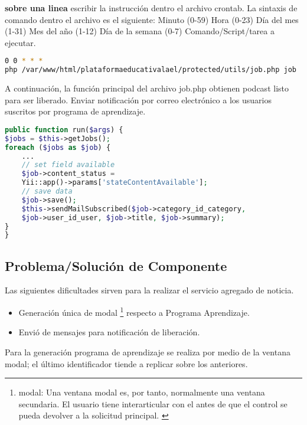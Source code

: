 \begin{itemize}
\textbf{sobre una linea} escribir la instrucción dentro el archivo crontab.
La sintaxis de comando dentro el archivo es el siguiente: Minuto (0-59)
Hora (0-23) Día del mes (1-31) Mes del año (1-12) Día de la semana (0-7)
Comando/Script/tarea a ejecutar.

\begin{lstlisting}[language=bash, caption={Comando para ejecución de tarea.}]
0 0 * * * 
php /var/www/html/plataformaeducativalael/protected/utils/job.php job
\end{lstlisting}

A continuación, la función principal del archivo job.php obtienen podcast
listo para ser liberado. Enviar notificación por correo electrónico a los
usuarios suscritos por programa de aprendizaje.

\begin{lstlisting}[language = PHP, caption={Método principal de clase JobCommand.}]
public function run($args) {	
$jobs = $this->getJobs();
foreach ($jobs as $job) {
	...
    // set field available
    $job->content_status = 
    Yii::app()->params['stateContentAvailable'];
    // save data
    $job->save();
    $this->sendMailSubscribed($job->category_id_category, 
    $job->user_id_user, $job->title, $job->summary);
}
}
\end{lstlisting}

\end{itemize}

\subsection{Problema/Solución de Componente}

Las siguientes dificultades sirven para la realizar el servicio agregado de
noticia.

\begin{itemize}

\item Generación única de modal \footnote{modal: Una ventana modal es, 
por tanto, normalmente una ventana secundaria. El usuario tiene interarticular
con el antes de que el control se pueda devolver a la solicitud principal.
\cite{modal}} respecto a Programa Aprendizaje.

\item Envió de mensajes para notificación de liberación.

\end{itemize}

Para la generación programa de aprendizaje se realiza por medio de la
ventana modal; el último identificador tiende a replicar sobre los anteriores.

